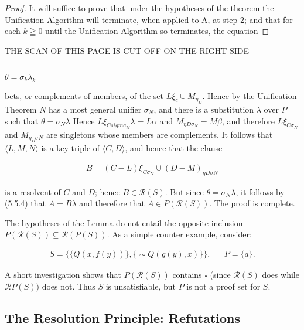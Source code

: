 \documentclass[8pt]{extarticle}
\begin{document}
\begin{proof}
It will suffice to prove that under the hypotheses of the theorem the
Unification Algorithm will terminate, when applied to A, at step 2; and that
for each $k \geqq 0$  until the Unification Algorithm so terminates, the equation
\end{proof}

\newpage

THE SCAN OF THIS PAGE IS CUT OFF ON THE RIGHT SIDE

\subsection{}
$\theta = \sigma_k\lambda_k$

\newpage
\noindent
bets, or complements of members, of the set $L\xi_c \cup M_{\eta_D}$. Hence by the Unification Theorem $N$ has a most general unifier $\sigma_N$, and there is a substitution $\lambda$ over $P$ such that $\theta = \sigma_N\lambda$ Hence $L\xi_{C sigma_N}\lambda = L\alpha$ and $M_{\eta D\sigma_N} = M\beta$, and therefore $L\xi_{C\sigma_N}$ and $M_{\eta_D\sigma N}$ are singletons whose members are complements. It follows that $\langle L, M, N\rangle$ is a key triple of $\langle C, D\rangle$, and hence that the clause

\begin{align*}
    B = (C - L)\xi_{C\sigma_N} \cup (D - M)_{\eta D\sigma N}
\end{align*}

is a resolvent of $C$ and $D$; hence $B \in \mathscr{R}(S)$. But since $\theta = \sigma_N\lambda$, it follows by (5.5.4) that $A = B\lambda$ and therefore that $A \in P(\mathscr{R}(S))$. The proof is complete.

The hypotheses of the Lemma do not entail the opposite inclusion $P(\mathscr{R}(S)) \subseteq \mathscr{R}(P(S))$. As a simple counter example, consider:

\begin{align*}
    S = \{\{Q(x,f(y))\},\{\sim Q(g(y),x)\}\}, && P = \{a\}.
\end{align*}

A short investigation shows that $P(\mathscr{R}(S))$ contains $\square$ (since $\mathscr{R}(S)$ does while $\mathscr{R}P(S))$ does not. Thus $S$ is unsatisfiable, but $P$ is not a proof set for $S$.

\subsection{The Resolution Principle: Refutations}
\end{document}
